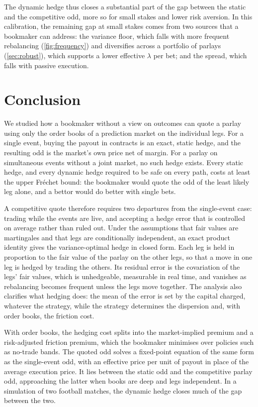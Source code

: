 \documentclass[11pt,a4paper]{article}
\theoremstyle{plain}
\theoremstyle{definition}
\theoremstyle{remark}
\newcommand{\1}{\mathbf{1}}
\begin{document}
The dynamic hedge thus closes a substantial part of the gap between the static and the competitive odd, more so for small stakes and lower risk aversion. In this calibration, the remaining gap at small stakes comes from two sources that a bookmaker can address: the variance floor, which falls with more frequent rebalancing (\cref{fig:frequency}) and diversifies across a portfolio of parlays (\cref{sec:robust}), which supports a lower effective $\lambda$ per bet; and the spread, which falls with passive execution.

\section{Conclusion}
\label{sec:conclusion}
We studied how a bookmaker without a view on outcomes can quote a parlay using only the order books of a prediction market on the individual legs. For a single event, buying the payout in contracts is an exact, static hedge, and the resulting odd is the market's own price net of margin. For a parlay on simultaneous events without a joint market, no such hedge exists. Every static hedge, and every dynamic hedge required to be safe on every path, costs at least the upper Fréchet bound: the bookmaker would quote the odd of the least likely leg alone, and a bettor would do better with single bets.

A competitive quote therefore requires two departures from the single-event case: trading while the events are live, and accepting a hedge error that is controlled on average rather than ruled out. Under the assumptions that fair values are martingales and that legs are conditionally independent, an exact product identity gives the variance-optimal hedge in closed form. Each leg is held in proportion to the fair value of the parlay on the other legs, so that a move in one leg is hedged by trading the others. Its residual error is the covariation of the legs' fair values, which is unhedgeable, measurable in real time, and vanishes as rebalancing becomes frequent unless the legs move together. The analysis also clarifies what hedging does: the mean of the error is set by the capital charged, whatever the strategy, while the strategy determines the dispersion and, with order books, the friction cost.

With order books, the hedging cost splits into the market-implied premium and a risk-adjusted friction premium, which the bookmaker minimises over policies such as no-trade bands. The quoted odd solves a fixed-point equation of the same form as the single-event odd, with an effective price per unit of payout in place of the average execution price. It lies between the static odd and the competitive parlay odd, approaching the latter when books are deep and legs independent. In a simulation of two football matches, the dynamic hedge closes much of the gap between the two.
\end{document}
